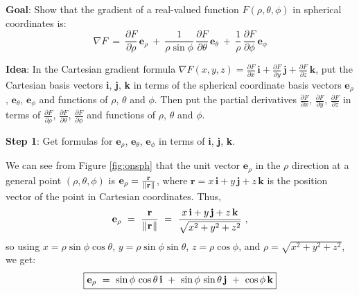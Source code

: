\newpage
\par\noindent\textbf{Goal}: Show that the gradient of a real-valued function $F(\rho,\theta,\phi)$ in spherical
coordinates is:
\begin{displaymath}
 \nabla F ~=~ \frac{\partial F}{\partial \rho}\,\textbf{e}_{\rho} ~+~
  \frac{1}{\rho \sin \phi}\,\frac{\partial F}{\partial \theta}\,\textbf{e}_{\theta} ~+~
  \frac{1}{\rho}\,\frac{\partial F}{\partial \phi}\,\textbf{e}_{\phi}
\end{displaymath}

\par\noindent\textbf{Idea}: In the Cartesian gradient formula $\nabla F(x,y,z) =
\frac{\partial F}{\partial x}\,\textbf{i} + \frac{\partial F}{\partial y}\,\textbf{j} +
\frac{\partial F}{\partial z}\,\textbf{k}$, put the Cartesian basis vectors \textbf{i}, \textbf{j}, \textbf{k} in terms
of the spherical coordinate basis vectors $\textbf{e}_{\rho}$, $\textbf{e}_{\theta}$, $\textbf{e}_{\phi}$ and functions
of $\rho$, $\theta$ and $\phi$. Then put the partial derivatives $\frac{\partial F}{\partial x}$,
$\frac{\partial F}{\partial y}$, $\frac{\partial F}{\partial z}$ in terms of $\frac{\partial F}{\partial \rho}$,
$\frac{\partial F}{\partial \theta}$, $\frac{\partial F}{\partial \phi}$ and functions of $\rho$, $\theta$ and $\phi$.\\

\par\noindent\textbf{Step 1}: Get formulas for $\textbf{e}_{\rho}$, $\textbf{e}_{\theta}$, $\textbf{e}_{\phi}$ in terms
of \textbf{i}, \textbf{j}, \textbf{k}.

We can see from Figure \ref{fig:onsph} that the unit vector $\textbf{e}_{\rho}$ in the $\rho$ direction at
a general point $(\rho,\theta,\phi)$ is $\textbf{e}_{\rho} = \frac{\textbf{r}}{\lVert\mspace{1mu}\textbf{r}\mspace{1mu}\rVert}$, where 
$\textbf{r} = x\,\textbf{i} + y\,\textbf{j} + z\,\textbf{k}$ is the position vector of the point in Cartesian
coordinates. Thus,
\begin{displaymath}
 \textbf{e}_{\rho} ~=~ \frac{\textbf{r}}{\lVert\mspace{1mu}\textbf{r}\mspace{1mu}\rVert}
  ~=~ \frac{x\,\textbf{i} + y\,\textbf{j} + z\,\textbf{k}}{\sqrt{x^2 + y^2 + z^2}} ~,
\end{displaymath}
so using $x=\rho\sin \phi \cos \theta$, $y=\rho\sin \phi \sin \theta$, $z=\rho\cos \phi$, and
$\rho = \sqrt{x^2 + y^2 + z^2}$, we get:
\begin{displaymath}
 \fbox{$\textbf{e}_{\rho} ~=~ \sin\phi\,\cos\theta\,\textbf{i} ~+~ \sin\phi\,\sin\theta\,\textbf{j} ~+~ \cos\phi\,\textbf{k}$}
\end{displaymath}

